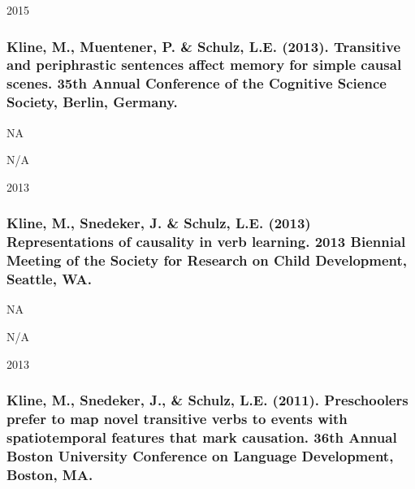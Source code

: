 \documentclass[
]{article}
\begin{document}
2015

\hypertarget{kline-m.-muentener-p.-schulz-l.e.-2013.-transitive-and-periphrastic-sentences-affect-memory-for-simple-causal-scenes.-35th-annual-conference-of-the-cognitive-science-society-berlin-germany.}{%
\subsubsection{Kline, M., Muentener, P. \& Schulz, L.E. (2013).
Transitive and periphrastic sentences affect memory for simple causal
scenes. 35th Annual Conference of the Cognitive Science Society, Berlin,
Germany.}\label{kline-m.-muentener-p.-schulz-l.e.-2013.-transitive-and-periphrastic-sentences-affect-memory-for-simple-causal-scenes.-35th-annual-conference-of-the-cognitive-science-society-berlin-germany.}}

NA

N/A

2013

\hypertarget{kline-m.-snedeker-j.-schulz-l.e.-2013-representations-of-causality-in-verb-learning.-2013-biennial-meeting-of-the-society-for-research-on-child-development-seattle-wa.}{%
\subsubsection{Kline, M., Snedeker, J. \& Schulz, L.E. (2013)
Representations of causality in verb learning. 2013 Biennial Meeting of
the Society for Research on Child Development, Seattle,
WA.}\label{kline-m.-snedeker-j.-schulz-l.e.-2013-representations-of-causality-in-verb-learning.-2013-biennial-meeting-of-the-society-for-research-on-child-development-seattle-wa.}}

NA

N/A

2013

\hypertarget{kline-m.-snedeker-j.-schulz-l.e.-2011.-preschoolers-prefer-to-map-novel-transitive-verbs-to-events-with-spatiotemporal-features-that-mark-causation.-36th-annual-boston-university-conference-on-language-development-boston-ma.}{%
\subsubsection{Kline, M., Snedeker, J., \& Schulz, L.E. (2011).
Preschoolers prefer to map novel transitive verbs to events with
spatiotemporal features that mark causation. 36th Annual Boston
University Conference on Language Development, Boston,
MA.}\label{kline-m.-snedeker-j.-schulz-l.e.-2011.-preschoolers-prefer-to-map-novel-transitive-verbs-to-events-with-spatiotemporal-features-that-mark-causation.-36th-annual-boston-university-conference-on-language-development-boston-ma.}}
\end{document}
